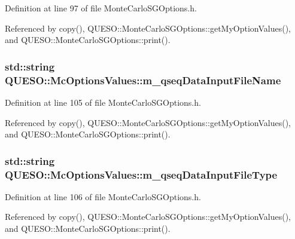 Definition at line 97 of file Monte\-Carlo\-S\-G\-Options.\-h.



Referenced by copy(), Q\-U\-E\-S\-O\-::\-Monte\-Carlo\-S\-G\-Options\-::get\-My\-Option\-Values(), and Q\-U\-E\-S\-O\-::\-Monte\-Carlo\-S\-G\-Options\-::print().

\hypertarget{class_q_u_e_s_o_1_1_mc_options_values_aedf79873213bca688ebbf6d873f42e8e}{
\subsubsection[{m\-\_\-qseq\-Data\-Input\-File\-Name}]{\setlength{\rightskip}{0pt plus 5cm}std\-::string Q\-U\-E\-S\-O\-::\-Mc\-Options\-Values\-::m\-\_\-qseq\-Data\-Input\-File\-Name}}\label{class_q_u_e_s_o_1_1_mc_options_values_aedf79873213bca688ebbf6d873f42e8e}


Definition at line 105 of file Monte\-Carlo\-S\-G\-Options.\-h.



Referenced by copy(), Q\-U\-E\-S\-O\-::\-Monte\-Carlo\-S\-G\-Options\-::get\-My\-Option\-Values(), and Q\-U\-E\-S\-O\-::\-Monte\-Carlo\-S\-G\-Options\-::print().

\hypertarget{class_q_u_e_s_o_1_1_mc_options_values_ac44d90277d7ba36d096ca5254614440d}{
\subsubsection[{m\-\_\-qseq\-Data\-Input\-File\-Type}]{\setlength{\rightskip}{0pt plus 5cm}std\-::string Q\-U\-E\-S\-O\-::\-Mc\-Options\-Values\-::m\-\_\-qseq\-Data\-Input\-File\-Type}}\label{class_q_u_e_s_o_1_1_mc_options_values_ac44d90277d7ba36d096ca5254614440d}


Definition at line 106 of file Monte\-Carlo\-S\-G\-Options.\-h.



Referenced by copy(), Q\-U\-E\-S\-O\-::\-Monte\-Carlo\-S\-G\-Options\-::get\-My\-Option\-Values(), and Q\-U\-E\-S\-O\-::\-Monte\-Carlo\-S\-G\-Options\-::print().

